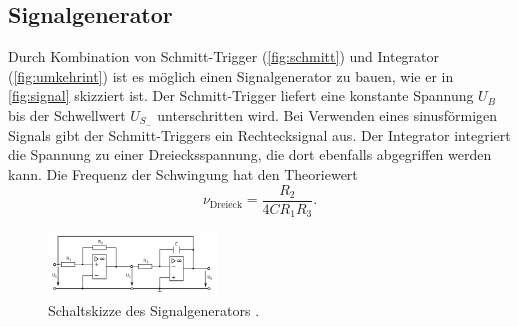 \subsection{Signalgenerator}
Durch Kombination von Schmitt-Trigger (\autoref{fig:schmitt}) und Integrator (\autoref{fig:umkehrint})
ist es möglich einen Signalgenerator zu bauen, wie er in \autoref{fig:signal} skizziert ist.
Der Schmitt-Trigger liefert eine konstante Spannung $U_B$ bis der Schwellwert $U_{S_{-}}$
unterschritten wird. Bei Verwenden eines sinusförmigen Signals gibt der Schmitt-Triggers
ein Rechtecksignal aus. Der Integrator integriert die Spannung zu einer Dreiecksspannung, die dort 
ebenfalls abgegriffen werden kann. Die Frequenz der Schwingung hat den Theoriewert
\begin{equation*}
    \nu_{\text{Dreieck}} = \frac{R_2}{4 C R_1 R_3}.
\end{equation*}
\begin{figure}[H]
    \centering
    \includegraphics[width=0.4\textwidth]{signalgenerator.png}
    \caption{Schaltskizze des Signalgenerators \cite{anleitung}.}
    \label{fig:signal}
\end{figure}

